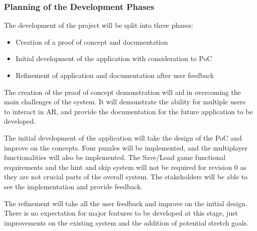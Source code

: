 \documentclass[12pt]{article}
\begin{document}


\subsubsection{Planning of the Development Phases}
The development of the project will be split into three phases:
\begin{itemize}
    \item Creation of a proof of concept and documentation
    \item Initial development of the application with consideration to PoC
    \item Refinement of application and documentation after user feedback
\end{itemize}
The creation of the proof of concept demonstration will aid in overcoming the main challenges of the system. It will demonstrate the ability for multiple users to interact in AR, and provide the documentation for the future application to be developed.

The initial development of the application will take the design of the PoC and improve on the concepts. Four puzzles will be implemented, and the multiplayer functionalities will also be implemented. The Save/Load game functional requirements and the hint and skip system will not be required for revision 0 as they are not crucial parts of the overall system. The stakeholders will be able to see the implementation and provide feedback. 

The refinement will take all the user feedback and improve on the initial design. There is no expectation for major features to be developed at this stage, just improvements on the existing system and the addition of potential stretch goals. 
\end{document}
